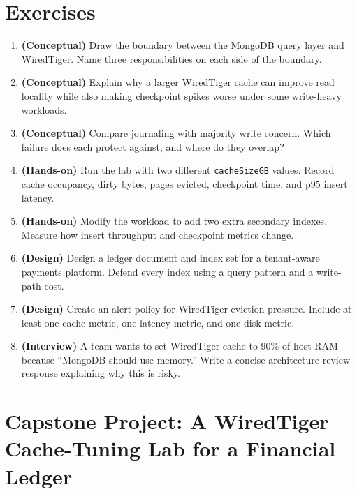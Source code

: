 \section{Exercises}
\begin{enumerate}
    \item \textbf{(Conceptual)} Draw the boundary between the MongoDB query layer and WiredTiger. Name three responsibilities on each side of the boundary.
    \item \textbf{(Conceptual)} Explain why a larger WiredTiger cache can improve read locality while also making checkpoint spikes worse under some write-heavy workloads.
    \item \textbf{(Conceptual)} Compare journaling with majority write concern. Which failure does each protect against, and where do they overlap?
    \item \textbf{(Hands-on)} Run the lab with two different \texttt{cacheSizeGB} values. Record cache occupancy, dirty bytes, pages evicted, checkpoint time, and p95 insert latency.
    \item \textbf{(Hands-on)} Modify the workload to add two extra secondary indexes. Measure how insert throughput and checkpoint metrics change.
    \item \textbf{(Design)} Design a ledger document and index set for a tenant-aware payments platform. Defend every index using a query pattern and a write-path cost.
    \item \textbf{(Design)} Create an alert policy for WiredTiger eviction pressure. Include at least one cache metric, one latency metric, and one disk metric.
    \item \textbf{(Interview)} A team wants to set WiredTiger cache to 90\% of host RAM because ``MongoDB should use memory.'' Write a concise architecture-review response explaining why this is risky.
\end{enumerate}

\section{Capstone Project: A WiredTiger Cache-Tuning Lab for a Financial Ledger}\label{sec:ch1-capstone}

